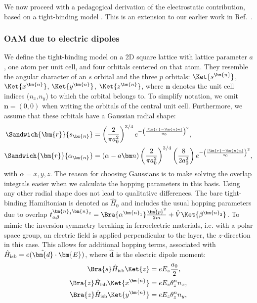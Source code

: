 We now proceed with a pedagogical derivation of the electrostatic contribution, based on a tight-binding model \cite{Bloch1929,Slater1954,Petersen2000,Kim2014,Go2016}. This is an extension to our earlier work in Ref.~\cite{Ponet2018}.

\subsubsection{OAM due to electric dipoles \label{sec:tb_model}}
We define the tight-binding model on a 2D square lattice with lattice parameter $a$, one atom per unit cell, and four orbitals centered on that atom.
They resemble the angular character of an $s$ orbital and the three $p$ orbitals: $\Ket{s^{\bm{n}}}$, $\Ket{x^{\bm{n}}}$, $\Ket{y^{\bm{n}}}$, $\Ket{z^{\bm{n}}}$, where $\bm{n}$ denotes the unit cell indices ($n_x$,$n_y$) to which the orbital belongs to.
To simplify notation, we omit $\bm{n} = (0, 0)$ when writing the orbitals of the central unit cell.
Furthermore, we assume that these orbitals have a Gaussian radial shape:
\begin{align}
	\Sandwich{\bm{r}}{s_{\bm{n}}} &= \left(\frac{2}{\pi a_0^2}\right)^{3/4}e^{-\left(\frac{|\bm{r}-\bm{n}a|}{a_0}\right)^2},\\
\Sandwich{\bm{r}}{\alpha_{\bm{n}}} &= (\alpha - a\bm n)\left(\frac{2}{\pi a_0^2}\right)^{3/4}\left(\frac{8}{2a_0^2}\right) e^{-\left(\frac{|\bm{r}-\bm{n}a|}{a_0}\right)^2},
\end{align}
with $\alpha = x, y, z$.
The reason for choosing Gaussians is to make solving the overlap integrals easier when we calculate the hopping parameters in this basis.
Using any other radial shape does not lead to qualitative differences.
The bare tight-binding Hamiltonian is denoted as $\hat{H}_0$ and includes the usual hopping parameters due to overlap $t_{\alpha\beta}^{\bm{n}_1\bm{n}_2} = \Bra{\alpha^{\bm{n}_1}}\frac{\hat{\bm{p}}^2}{2m} + \hat{V}\Ket{\beta^{\bm{n}_2}}$.
To mimic the inversion symmetry breaking in ferroelectric materials, i.e. with a polar space group, an electric field is applied perpendicular to the layer, the $z$-direction in this case.
This allows for additional hopping terms, associated with $\hat{H}_{\rm isb} = e (\hat{\bm{d}}\cdot \bm{E})$, where $\hat{\bm{d}}$ is the electric dipole moment:
\begin{align}
	\label{eq:dipole}
	\Bra{s} \hat{H}_{\rm isb} \Ket{z} &=  e E_z \frac{a_0}{2},\\
	\Bra{z} \hat{H}_{\rm isb} \Ket{x^{\bm{n}}} &= e E_z \theta_z^n n_x,\\
	\Bra{z} \hat{H}_{\rm isb} \Ket{y^{\bm{n}}} &= e E_z \theta_z^n n_y,
\end{align}
